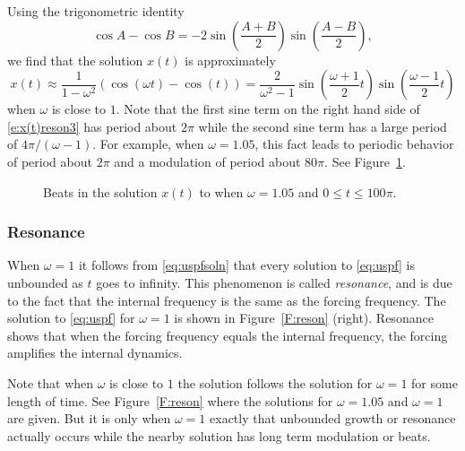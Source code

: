 \documentclass{ximera}
\begin{document}
Using the trigonometric identity
\[
\cos A - \cos B = -2\sin\left(\frac{A+B}{2}\right)
\sin\left(\frac{A-B}{2}\right),
\]
we find that the solution $x(t)$ is approximately
\begin{equation}  \label{e:x(t)reson3}
x(t) \approx  \frac{1}{1-\omega^2} (\cos(\omega t)-\cos(t))=
\frac{2}{\omega ^2-1}
\sin\left(\frac{\omega+1}{2}t\right)\sin\left(\frac{\omega-1}{2}t\right)
\end{equation}
when $\omega$ is close to $1$.  Note that the first sine term on the right hand
side of \eqref{e:x(t)reson3} has period about $2\pi$ while the second sine term 
has a large period of $4\pi/(\omega-1)$.  For example, when $\omega=1.05$, this
fact leads to periodic behavior of period about $2\pi$ and a 
modulation 
of period about $80\pi$.  See Figure~\ref{F:beats}.
\begin{figure}[htb]
           \centerline{%
           }
           \caption{Beats in the solution $x(t)$ to \protect{\eqref{e:x(t)reson}} 
		when $\omega =1.05$ and $0\leq t\leq 100\pi$.}
           \label{F:beats}
\end{figure}  

\subsubsection*{Resonance}

When $\omega = 1$ it follows from \eqref{eq:uspfsoln} that every
solution to \eqref{eq:uspf} is unbounded as $t$ goes to infinity.  This
phenomenon is called {\em resonance\/}, and is due to the fact that the
internal frequency is the same as the 
forcing frequency.  The solution
to \eqref{eq:uspf} for $\omega=1$ is shown in Figure~\ref{F:reson} (right).
Resonance shows that when the forcing frequency equals the internal 
frequency, the forcing amplifies the internal dynamics.

Note that when $\omega$ is close to $1$ the solution follows the solution 
for $\omega =1$ for some length of time.  See Figure~\ref{F:reson} where 
the solutions for $\omega =1.05$ and $\omega =1$ are given.  But it is only 
when $\omega =1$ exactly that unbounded growth or resonance actually occurs 
while the nearby solution has long term modulation or beats.
\begin{figure*}[htb]
           \centerline{%
           }
           \caption{Two solutions $x(t)$ from \protect{\eqref{e:x(t)reson}} when
                $\omega =1.05$ and $\omega =1$ for $0\leq t\leq 30\pi$.}
           \label{F:reson}
\end{figure*}  
\end{document}
